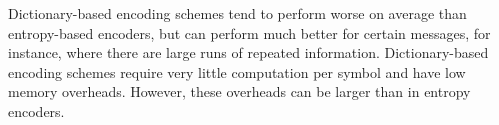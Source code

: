 \documentclass[a4paper,11pt]{report}
\begin{document}
Dictionary-based encoding schemes tend to perform worse on average than entropy-based encoders, but can perform much better for certain messages, for instance, where there are large runs of repeated information. Dictionary-based encoding schemes require very little computation per symbol and have low memory overheads. However, these overheads can be larger than in entropy encoders. 

% 
% 
% 
% 
\end{document}
